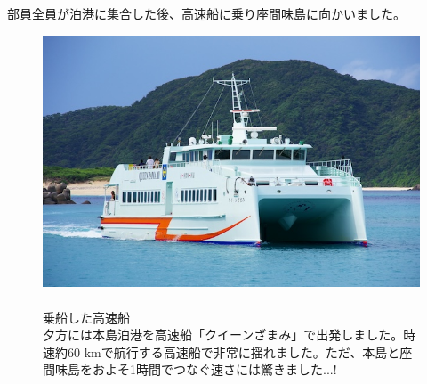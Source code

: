 \documentclass[../main]{subfiles}
\begin{document}
部員全員が泊港に集合した後、高速船に乗り座間味島に向かいました。
\begin{figure}[H]
  \begin{minipage}[b]{0.48\columnwidth}
    \centering
    \includegraphics[width=\columnwidth]{figure/queen_zamami.jpg}
  \end{minipage}
  \hspace{0.04\columnwidth} %
  \begin{minipage}[b]{0.48\columnwidth}
    \caption{\\
    乗船した高速船\\
    夕方には本島泊港を高速船「クイーンざまみ」で出発しました。時速約60 kmで航行する高速船で非常に揺れました。ただ、本島と座間味島をおよそ1時間でつなぐ速さには驚きました...!
    }
  \end{minipage}
\end{figure}
\end{document}
